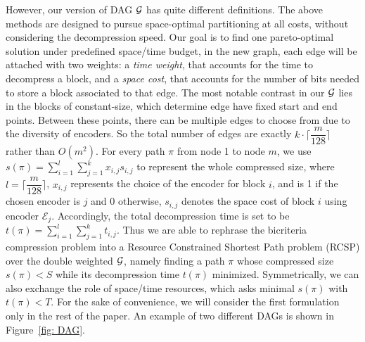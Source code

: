 \documentclass{sig-alternate-05-2015}
\begin{document}
However, our version of DAG $ \cal G $ has quite different definitions.
The above methods are designed to pursue space-optimal partitioning at all costs, without considering the decompression speed.
Our goal is to find one pareto-optimal solution under predefined space/time budget, in the new graph, each edge will be attached with two weights: a \textit{time weight}, that accounts for the time to decompress a block, and a \textit{space cost}, that accounts for the number of bits needed to store a block associated to that edge.
The most notable contrast in our $ \cal G $ lies in the blocks of constant-size, which determine edge have fixed start and end points.
Between these points, there can be multiple edges to choose from due to the diversity of encoders.
So the total number of edges are exactly $ k \cdot \lceil \dfrac{m}{128} \rceil $ rather than $ O(m^2) $.
For every path $ \pi $ from node 1 to node $ m $, we use $ s(\pi) = \sum_{i=1}^{l}\sum_{j=1}^{k}x_{i,j}s_{i,j} $ to represent the whole compressed size, where $ l= \lceil \dfrac{m}{128} \rceil$, $ x_{i,j} $ represents the choice of the encoder for block $ i $, and is 1 if the chosen encoder is $ j $ and 0 otherwise, $ s_{i,j} $ denotes the space cost of block $ i $ using encoder $ \mathcal{E}_j $.
Accordingly, the total decompression time is set to be $ t(\pi) = \sum_{i=1}^{l}\sum_{j=1}^{k}t_{i,j} $.
Thus we are able to rephrase the bicriteria compression problem into a Resource Constrained Shortest Path problem (RCSP) over the double weighted $ \cal G $, namely finding a path $ \pi $ whose compressed size $ s(\pi) < S $ while its decompression time $ t(\pi) $ minimized.
Symmetrically, we can also exchange the role of space/time resources, which asks minimal $ s(\pi) $ with $ t(\pi) < T $.
For the sake of convenience, we will consider the first formulation only in the rest of the paper. 
An example of two different DAGs is shown in Figure~\ref{fig: DAG}.
\end{document}
